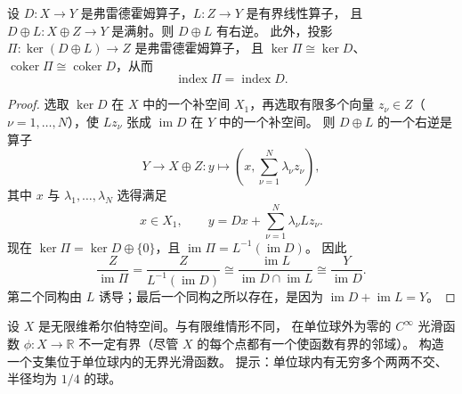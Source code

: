 \begin{lemma}\label{lem:A-3-6}
设 $D:X\to Y$ 是弗雷德霍姆算子，$L:Z\to Y$ 是有界线性算子，
且 $D\oplus L:X\oplus Z\to Y$ 是满射。则 $D\oplus L$ 有右逆。
此外，投影 $\Pi:\ker(D\oplus L)\to Z$ 是弗雷德霍姆算子，
且 $\ker\Pi\cong\ker D$、
$\operatorname{coker}\Pi\cong\operatorname{coker}D$，从而
\[
  \operatorname{index}\Pi=\operatorname{index}D.
\]
\end{lemma}

\begin{proof}
选取 $\ker D$ 在 $X$ 中的一个补空间 $X_1$，再选取有限多个向量
$z_\nu\in Z$（$\nu=1,\ldots,N$），使 $Lz_\nu$ 张成
$\operatorname{im}D$ 在 $Y$ 中的一个补空间。
则 $D\oplus L$ 的一个右逆是算子
\[
  Y\longrightarrow X\oplus Z:
  y\longmapsto\left(x,\sum_{\nu=1}^N\lambda_\nu z_\nu\right),
\]
其中 $x$ 与 $\lambda_1,\ldots,\lambda_N$ 选得满足
\[
  x\in X_1,\qquad
  y=Dx+\sum_{\nu=1}^N\lambda_\nu Lz_\nu.
\]
现在 $\ker\Pi=\ker D\oplus\{0\}$，且
$\operatorname{im}\Pi=L^{-1}(\operatorname{im}D)$。
因此
\[
  \frac{Z}{\operatorname{im}\Pi}
  =\frac{Z}{L^{-1}(\operatorname{im}D)}
  \cong\frac{\operatorname{im}L}
  {\operatorname{im}D\cap\operatorname{im}L}
  \cong\frac{Y}{\operatorname{im}D}.
\]
第二个同构由 $L$ 诱导；最后一个同构之所以存在，是因为
$\operatorname{im}D+\operatorname{im}L=Y$。
\end{proof}

\begin{exercise}\label{ex:A-3-7}
设 $X$ 是无限维希尔伯特空间。与有限维情形不同，
在单位球外为零的 $C^\infty$ 光滑函数
$\phi:X\to\mathbb R$ 不一定有界（尽管 $X$ 的每个点都有一个使函数有界的邻域）。
构造一个支集位于单位球内的无界光滑函数。
提示：单位球内有无穷多个两两不交、半径均为 $1/4$ 的球。
\end{exercise}
